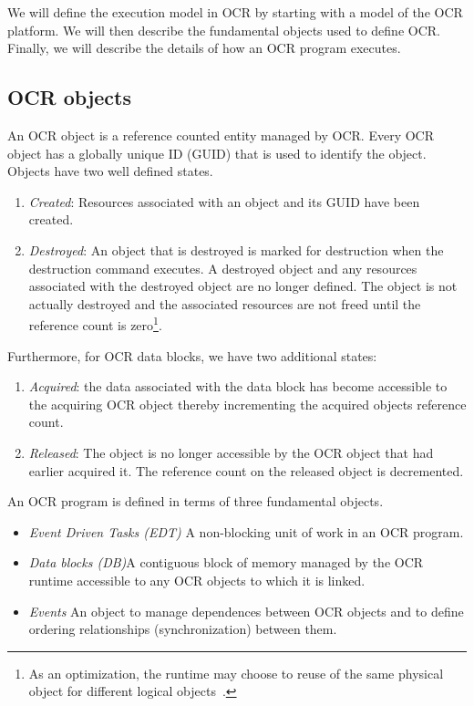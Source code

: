 We will define the execution model in OCR by starting with a model of
the OCR platform. We will then describe the fundamental objects used
to define OCR. Finally, we will describe the details of how an OCR
program executes.


\subsection{OCR objects}
\label{sec:OCRobjects}

An OCR object is a reference counted entity managed by OCR. Every OCR
object has a globally unique ID (GUID) that is used to identify the
object. Objects have two well defined states.
\begin{enumerate}
\item \emph{Created}: Resources associated with an object and its GUID
have been created.
\item \emph{Destroyed}: An object that is destroyed is marked for
destruction when the destruction command executes. A destroyed object
and any resources associated with the destroyed object are no longer
defined. The object is not actually destroyed and the associated
resources are not freed until the reference count is zero\footnote{As
an optimization, the runtime may choose to reuse of the same physical
object for different logical objects~\cite{USBCSS12,SbKS12}.}.
%
\end{enumerate}
Furthermore, for OCR data blocks, we have two additional states:
\begin{enumerate}
\item \emph{Acquired}: the data associated with the data block has
become accessible to the acquiring OCR object thereby incrementing the
acquired objects reference count.
\item \emph{Released}: The object is no longer accessible by the OCR
object that had earlier acquired it. The reference count on the
released object is decremented.
\end{enumerate}

An OCR program is defined in terms of three fundamental objects.
\begin{itemize}
\item \emph{Event Driven Tasks (EDT)} A non-blocking unit of work in an OCR
program.
\item\emph{Data blocks (DB)}A contiguous block of memory managed by the
OCR runtime accessible to any OCR objects to which it is linked.
\item\emph{Events} An object to manage dependences between OCR objects and
to define ordering relationships (synchronization) between them.
\end{itemize}

